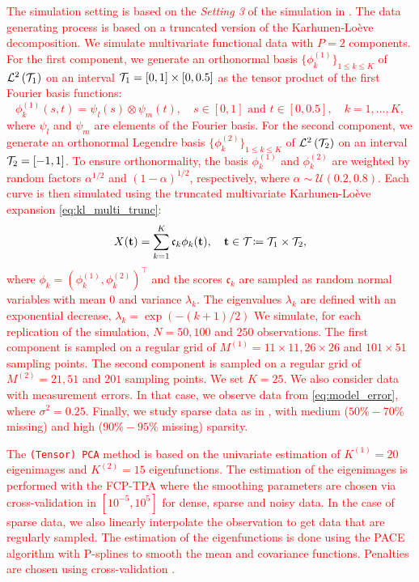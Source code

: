 \textcolor{red}{The simulation setting is based on the \emph{Setting 3} of the simulation in \cite{happMultivariateFunctionalPrincipal2018a}.
The data generating process is based on a truncated version of the Karhunen-Loève decomposition. We simulate multivariate functional data with $P = 2$ components. For the first component, we generate an orthonormal basis $\{\phi^{(1)}_k\}_{1 \leq k \leq K}$ of $\mathcal{L}^{2}\left(\mathcal{T}_{1}\right)$ on an interval $\mathcal{T}_{1} = [0, 1] \times [0, 0.5]$ as the tensor product of the first Fourier basis functions:
\begin{equation}
    \phi^{(1)}_k(s, t) = \psi_l(s) \otimes \psi_m(t), \quad s \in [0, 1] \text{ and } t \in [0, 0.5],\quad k = 1, \dots, K,
\end{equation}
where $\psi_l$ and $\psi_m$ are elements of the Fourier basis. For the second component, we generate an orthonormal Legendre basis $\{\phi^{(2)}_k\}_{1 \leq k \leq K}$ of $\mathcal{L}^{2}\left(\mathcal{T}_{2}\right)$ on an interval $\mathcal{T}_{2} = [-1, 1]$. To ensure orthonormality, the basis $\phi^{(1)}_k$ and $\phi^{(2)}_k$ are weighted by random factors $\alpha^{1/2}$ and $(1 - \alpha)^{1/2}$, respectively, where $\alpha \sim \mathcal{U}(0.2, 0.8)$.
Each curve is then simulated using the truncated multivariate Karhunen-Loève expansion \eqref{eq:kl_multi_trunc}:
\begin{equation}
    X(\mathbf{t}) = \sum_{k = 1}^K \mathfrak{c}_k \phi_k(\mathbf{t}), \quad \mathbf{t} \in \mathcal{T}_{} \coloneqq \mathcal{T}_{1} \times \mathcal{T}_{2},
\end{equation}
where $\phi_k = (\phi^{(1)}_k, \phi^{(2)}_k)^\top$ and the scores $\mathfrak{c}_k$ are sampled as random normal variables with mean $0$ and variance $\lambda_k$. The eigenvalues $\lambda_k$ are defined with an exponential decrease, $\lambda_k = \exp(-(k + 1)/2)$ We simulate, for each replication of the simulation, $N = 50, 100$ and $250$ observations. The first component is sampled on a regular grid of $M^{(1)} = 11 \times 11, 26 \times 26$ and $101 \times 51$ sampling points. The second component is sampled on a regular grid of $M^{(2)} = 21, 51$ and $201$ sampling points. We set $K = 25$.}
\textcolor{red}{We also consider data with measurement errors. In that case, we observe data from \eqref{eq:model_error}, where $\sigma^2 = 0.25$. Finally, we study sparse data as in \cite{happMultivariateFunctionalPrincipal2018a}, with medium ($50\%-70\%$ missing) and high ($90\%-95\%$ missing) sparsity.}

\textcolor{red}{The \texttt{(Tensor) PCA} method is based on the univariate estimation of $K^{(1)} = 20$ eigenimages and $K^{(2)} = 15$ eigenfunctions. The estimation of the eigenimages is performed with the FCP-TPA where the smoothing parameters are chosen via cross-validation in $[10^{-5}, 10^5]$ for dense, sparse and noisy data. In the case of sparse data, we also linearly interpolate the observation to get data that are regularly sampled. The estimation of the eigenfunctions is done using the PACE algorithm \citep{yaoFunctionalDataAnalysis2005} with P-splines to smooth the mean and covariance functions. Penalties are chosen using cross-validation \citep{eilersFlexibleSmoothingBsplines1996}.}


